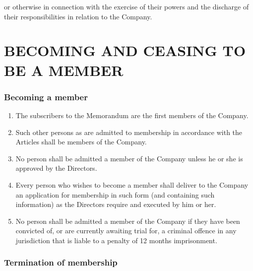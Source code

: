\documentclass[a4paper,12pt]{article}
\begin{document}
or otherwise in connection with the exercise of their powers and the discharge of their responsibilities in relation to the Company.

\part*{BECOMING AND CEASING TO BE A MEMBER}

\section{Becoming a member}

\begin{enumerate}
  \color{red}
  \item The subscribers to the Memorandum are the first members of the Company. %
  \item Such other persons as are admitted to membership in accordance with the Articles shall be members of the Company. %
  \item No person shall be admitted a member of the Company unless he or she is approved by the Directors. %
  \item Every person who wishes to become a member shall deliver to the Company an application for membership in such form (and containing such information) as the Directors require and executed by him or her.\color{black} %
  \item No person shall be admitted a member of the Company if they have been convicted of, or are currently awaiting trial for, a criminal offence in any jurisdiction that is liable to a penalty of 12 months imprisonment. %
\end{enumerate}

\section{Termination of membership}
\end{document}
